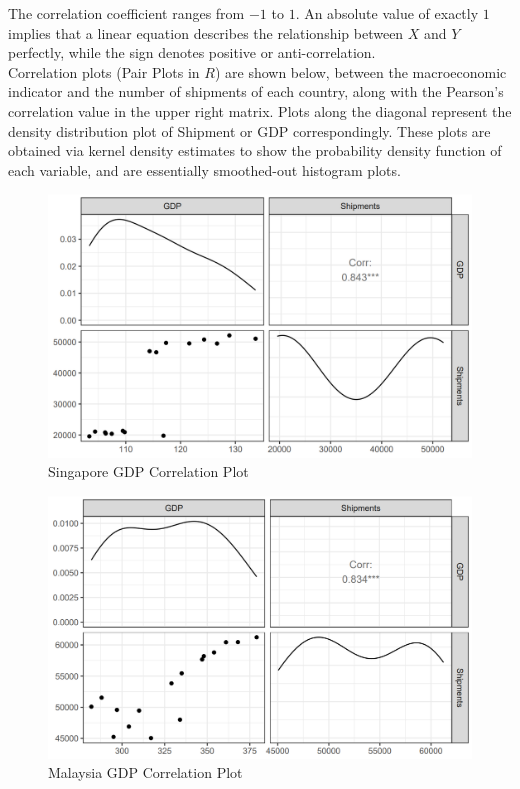 \documentclass{article}
\begin{document}
\noindent The correlation coefficient ranges from $-1$ to $1$. An absolute value of exactly $1$ implies that a linear equation describes the relationship between $X$ and $Y$ perfectly, while the sign denotes positive or anti-correlation. \\

\noindent Correlation plots (Pair Plots in $R$) are shown below, between the macroeconomic indicator and the number of shipments of each country, along with the Pearson's correlation value in the upper right matrix. Plots along the diagonal represent the density distribution plot of Shipment or GDP correspondingly. These plots are obtained via kernel density estimates to show the probability density function of each variable, and are essentially smoothed-out histogram plots.

\begin{figure}[H]
    \centering
    \includegraphics[width=1\textwidth]{images/Line Plots/Singapore/Singapore_Corrplot.png}
    \caption{Singapore GDP Correlation Plot}
    \label{fig:my_label}
\end{figure}

\begin{figure}[H]
    \centering
    \includegraphics[width=1\textwidth]{images/Line Plots/Malaysia/Malaysia_Corrplot.png}
    \caption{Malaysia GDP Correlation Plot}
    \label{fig:my_label}
\end{figure}
\end{document}
